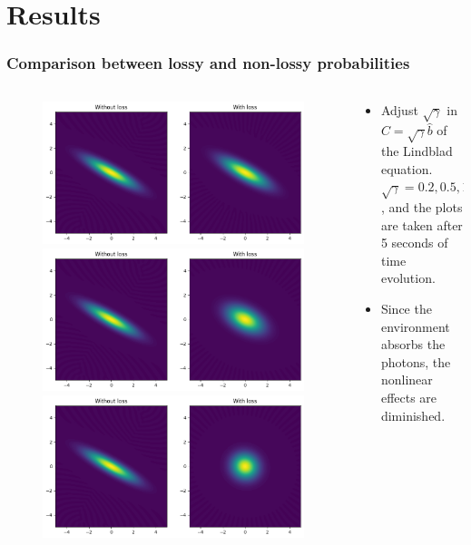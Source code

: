 \documentclass{beamer}
\begin{document}
\section{Results}
\begin{frame}[c]
  \frametitle{Comparison between lossy and non-lossy probabilities}
  \begin{columns}
  \begin{column}{0.5\linewidth}
  \begin{figure}
  \includegraphics[width=0.7\linewidth]{squeezed_decay_0.2.png}
  \includegraphics[width=0.7\linewidth]{squeezed_decay_0.5.png}
  \includegraphics[width=0.7\linewidth]{squeezed_decay_1.0.png}
  \end{figure}
  \end{column}
  \begin{column}{0.5\linewidth}
    \begin{itemize}
      \item Adjust $\sqrt{\gamma}$ in $C=\sqrt{\gamma}\hat{b}$ of the Lindblad equation. $\sqrt{\gamma}=0.2,0.5,1.0$, and the plots are taken after 5 seconds of time evolution.
      \item Since the environment absorbs the photons, the nonlinear effects are diminished.
    \end{itemize}
  \end{column}
  \end{columns}
\end{frame}
\end{document}
